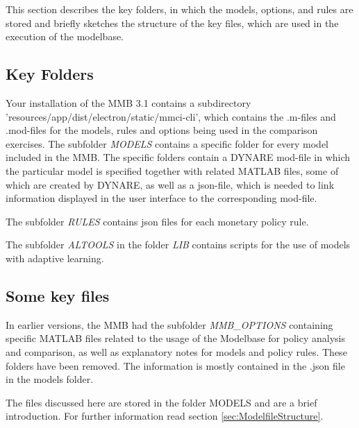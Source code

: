 This section describes the key folders, in which the models, options, and rules are stored and briefly sketches the structure of the key files, which are used in the execution of the modelbase.

\subsection*{Key Folders}
 
Your installation of the MMB 3.1 contains a subdirectory 'resources/app/dist/electron/static/mmci-cli', which contains the .m-files and .mod-files for the models, rules and options being used in the comparison exercises. 
The subfolder \textit{MODELS} contains a specific folder for every model included in the MMB. The specific folders contain a  DYNARE mod-file in which the particular model is specified together with related MATLAB files, some of which are created by DYNARE, as well as a json-file, which is needed to link information displayed in the user interface to the corresponding mod-file. 

The subfolder \textit{RULES} contains json files for each monetary policy rule.

The subfolder \textit{ALTOOLS} in the folder \textit{LIB} contains scripts for the use of models with adaptive learning. 

\subsection*{Some key files}
In earlier versions, the MMB had the subfolder \textit{MMB\_OPTIONS} containing specific MATLAB files related to the usage of the Modelbase for policy analysis and comparison, as well as explanatory notes for models and policy rules. These folders have been removed. The information is mostly contained in the .json file in the models folder.   

The files discussed here are stored in the folder MODELS and are a brief introduction. For further information read section \ref{sec:ModelfileStructure}.

